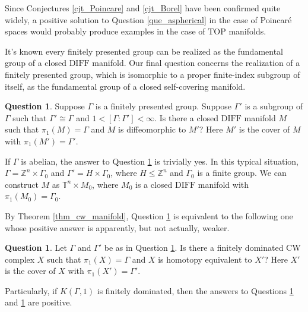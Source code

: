 \documentclass[12pt]{amsart}
\theoremstyle{plain}
\theoremstyle{definition}
\theoremstyle{question}
\newtheorem{question}[theorem]{Question}
\theoremstyle{remark}
\theoremstyle{assumption}
\numberwithin{equation}{section}
\theoremstyle{bigthm}
\begin{document}
Since Conjectures \ref{cjt_Poincare} and \ref{cjt_Borel} have been confirmed quite widely, a positive solution to Question \ref{que_aspherical} in the case of Poincar\'{e} spaces would probably produce examples in the case of $\mathrm{TOP}$ manifolds.

It's known every finitely presented group can be realized as the fundamental group of a closed $\mathrm{DIFF}$ manifold. Our final question concerns the realization of a finitely presented group, which is isomorphic to a proper finite-index subgroup of itself, as the fundamental group of a closed self-covering manifold.
\begin{question}\label{que_group_manifold}
Suppose $\Gamma$ is a finitely presented group. Suppose $\Gamma'$ is a subgroup of $\Gamma$ such that $\Gamma' \cong \Gamma$ and $1 < [\Gamma: \Gamma'] < \infty$. Is there a closed $\mathrm{DIFF}$ manifold $M$ such that $\pi_{1} (M) = \Gamma$ and $M$ is diffeomorphic to $M'$? Here $M'$ is the cover of $M$ with $\pi_{1} (M') = \Gamma'$.
\end{question}

If $\Gamma$ is abelian, the answer to Question \ref{que_group_manifold} is trivially yes. In this typical situation, $\Gamma = \mathbb{Z}^{n} \times \Gamma_{0}$ and $\Gamma' = H \times \Gamma_{0}$, where $H \le \mathbb{Z}^{n}$ and $\Gamma_{0}$ is a finite group. We can construct $M$ as $\mathbb{T}^{n} \times M_{0}$, where $M_{0}$ is a closed $\mathrm{DIFF}$ manifold with $\pi_{1} (M_{0}) = \Gamma_{0}$.

By Theorem \ref{thm_cw_manifold}, Question \ref{que_group_manifold} is equivalent to the following one whose positive answer is apparently, but not actually, weaker.
\begin{question}\label{que_group_space}
Let $\Gamma$ and $\Gamma'$ be as in Question \ref{que_group_manifold}. Is there a finitely dominated CW complex $X$ such that $\pi_{1} (X) = \Gamma$ and $X$ is homotopy equivalent to $X'$? Here $X'$ is the cover of $X$ with $\pi_{1} (X') = \Gamma'$.
\end{question}

Particularly, if $K(\Gamma, 1)$ is finitely dominated, then the answers to Questions \ref{que_group_manifold} and \ref{que_group_space} are positive.
\end{document}
